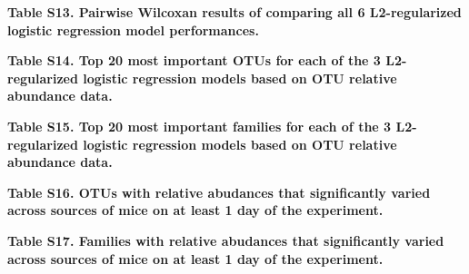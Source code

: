 \documentclass[11pt,]{article}
\begin{document}
\textbf{Table S13. Pairwise Wilcoxan results of comparing all 6
L2-regularized logistic regression model performances.}

\textbf{Table S14. Top 20 most important OTUs for each of the 3
L2-regularized logistic regression models based on OTU relative
abundance data.}

\textbf{Table S15. Top 20 most important families for each of the 3
L2-regularized logistic regression models based on OTU relative
abundance data.}

\textbf{Table S16. OTUs with relative abudances that significantly
varied across sources of mice on at least 1 day of the experiment.}

\textbf{Table S17. Families with relative abudances that significantly
varied across sources of mice on at least 1 day of the experiment.}
\end{document}
